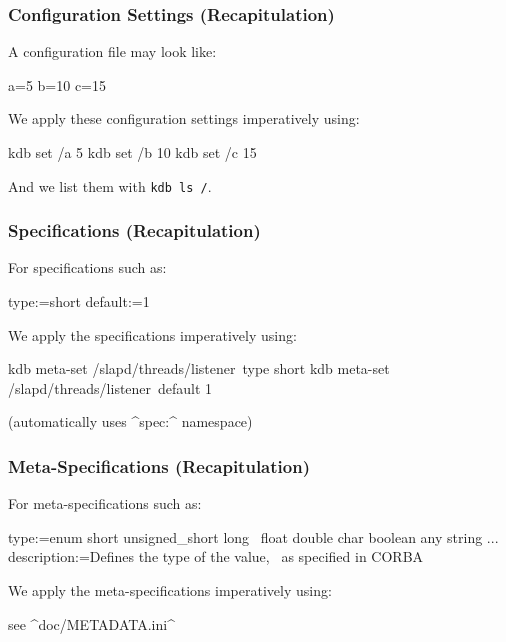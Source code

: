 \begin{frame}[fragile]
	\frametitle{Configuration Settings (Recapitulation)}

	A configuration file may look like:

	\begin{code}[language=CfgElektra]
	a=5
	b=10
	c=15
	\end{code}

	We apply these configuration settings imperatively using:

	\begin{code}[language=bash]
	kdb set /a 5
	kdb set /b 10
	kdb set /c 15
	\end{code}

	And we list them with \lstinline[language=bash,morekeywords={ls},showspaces=no]^kdb ls /^.
\end{frame}

\begin{frame}[fragile]
	\frametitle{Specifications (Recapitulation)}
	For specifications such as:

	\begin{code}
	  type:=short
	  default:=1
	\end{code}

	We apply the specifications imperatively using:

	\begin{code}[language=bash,morekeywords={meta,set,default}]
	kdb meta-set /slapd/threads/listener\
		type short
	kdb meta-set /slapd/threads/listener\
		default 1
	\end{code}

	(automatically uses ^spec:^ namespace)
\end{frame}

\begin{frame}[fragile]
	\frametitle{Meta-Specifications (Recapitulation)}
	For meta-specifications such as:

	\small
	\begin{code}[gobble=4]
	[type]
	type:=enum short unsigned_short long \
		float double char boolean any string ...
	description:=Defines the type of the value, \
		 as specified in CORBA
	\end{code}

	We apply the meta-specifications imperatively using:


	\large
	see ^doc/METADATA.ini^
\end{frame}

